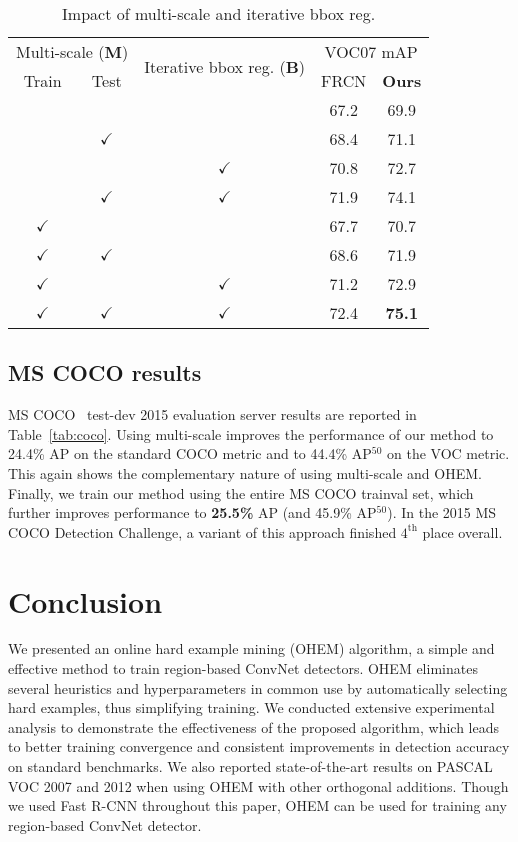 \documentclass[10pt,twocolumn,letterpaper]{article}
\begin{document}
\begin{table}[t!]
\centering
\small
\setlength{\tabcolsep}{0.8em}
\caption[caption]{Impact of multi-scale and iterative bbox reg.}
\vspace{-0.1in}
\begin{tabular}{cc c c c}
\toprule
\multicolumn{2}{c}{Multi-scale (\textbf{M})} & \multirow{2}{*}{\parbox{2cm}{\centering Iterative bbox reg. (\textbf{B})}} & \multicolumn{2}{c}{VOC07 mAP} \\\cmidrule{1-2}\cmidrule{4-5}
Train & Test &  & FRCN & \textbf{Ours} \\
\midrule
& & & 67.2 & 69.9\\
& $\checkmark$ & & 68.4& 71.1\\
& & $\checkmark$ & 70.8& 72.7\\
& $\checkmark$& $\checkmark$ & 71.9 & 74.1\\
\midrule
$\checkmark$& & & 67.7& 70.7\\
$\checkmark$& $\checkmark$ & & 68.6& 71.9\\
$\checkmark$& & $\checkmark$ & 71.2& 72.9\\
$\checkmark$& $\checkmark$& $\checkmark$ & 72.4 & \textbf{75.1}\\
\bottomrule
\end{tabular}
\label{tab:msms}
\vspace{-0.13in}
\end{table}

\subsection{MS COCO results}
MS COCO~\cite{coco} test-dev 2015 evaluation server results are reported in Table~\ref{tab:coco}. Using multi-scale improves the performance of our method to 24.4\% AP on the standard COCO metric and to 44.4\% AP$^{50}$ on the VOC metric. This again shows the complementary nature of using multi-scale and OHEM. Finally, we train our method using the entire MS COCO trainval set, which further improves performance to \textbf{25.5\%} AP (and 45.9\% AP$^{50}$). In the 2015 MS COCO Detection Challenge, a variant of this approach finished $4^{\text{th}}$ place overall.




\vspace{-0.05in}
\section{Conclusion}
\vspace{-0.03in}
We presented an online hard example mining (OHEM) algorithm, a simple and effective method to train region-based ConvNet detectors. OHEM eliminates several heuristics and hyperparameters in common use by automatically selecting hard examples, thus simplifying training. We conducted extensive experimental analysis to demonstrate the effectiveness of the proposed algorithm, which leads to better training convergence and consistent improvements in detection accuracy on standard benchmarks. We also reported state-of-the-art results on PASCAL VOC 2007 and 2012 when using OHEM with other orthogonal additions. Though we used Fast R-CNN throughout this paper, OHEM can be used for training any region-based ConvNet detector.
\end{document}
